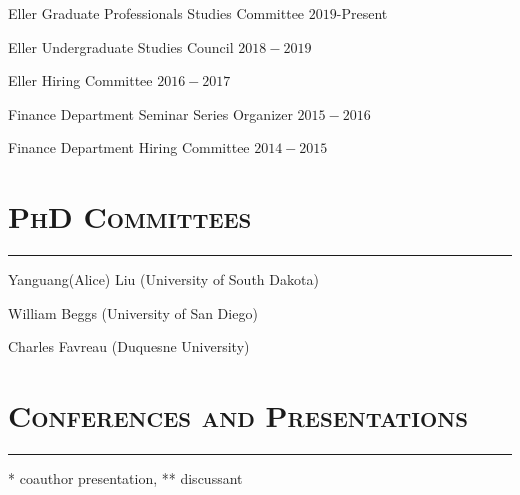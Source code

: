 \documentclass[10pt,letterpaper]{article}
\renewenvironment{itemize}{
  \begin{list}{}{
    \setlength{\leftmargin}{1.5em}
    \setlength{\itemsep}{0.25em}
    \setlength{\parskip}{0pt}
    \setlength{\parsep}{0.25em}
  }
}{
  \end{list}
}
\begin{document}
\begin{itemize}
\item Eller Graduate Professionals Studies Committee \hfill $2019$-Present
\item Eller Undergraduate Studies Council \hfill $2018-2019$
\item Eller Hiring Committee \hfill $2016-2017$
\item Finance Department Seminar Series Organizer \hfill $2015-2016$
\item Finance Department Hiring Committee \hfill $2014-2015$
\end{itemize}

\section*{\textsc{PhD Committees}}
\nointerlineskip
\vspace{-3mm}
\rule{\textwidth}{0.5mm}

\begin{itemize}
\item Yanguang(Alice) Liu (University of South Dakota)
\end{itemize}

\begin{itemize}
\item William Beggs (University of San Diego)
\end{itemize}

\begin{itemize}
\item Charles Favreau (Duquesne University)
\end{itemize}






\section*{\textsc{Conferences and Presentations}}
\nointerlineskip
\vspace{-3mm}
\rule{\textwidth}{0.5mm}
* coauthor presentation, ** discussant
\end{document}
